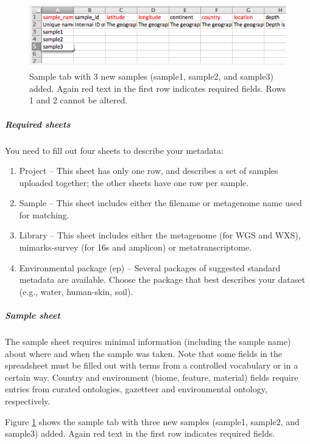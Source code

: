 \documentclass[12pt,fullpage]{report}
\begin{document}
\begin{figure}[ht]
\begin{center}
\includegraphics[width=6in]{Images/project-spreadsheet-with-3-samples.png}
\end{center}
\caption{
Sample tab with 3 new samples (sample1, sample2, and sample3) added. Again red text in the first row indicates required fields. Rows 1 and 2 cannot be altered.
}
\label{fig:project-spreadsheet-with-3-samples}
\end{figure}

\subparagraph*{Required sheets}
You need to fill out four sheets to describe your metadata:

\begin{enumerate}
\item Project --
This sheet has only one row, and describes a set of samples uploaded together; the other sheets have one row per sample.

\item Sample --
This sheet includes either the filename or metagenome name used for matching.

\item Library --
This sheet includes either the metagenome (for WGS and WXS), mimarks-survey (for \gls{16s} and amplicon) or metatranscriptome.

\item Environmental package (ep) --
Several packages of suggested standard metadata are available.
Choose the package that best describes your dataset (e.g., water, human-skin, soil).

\end{enumerate}

\subparagraph*{Sample sheet}
The sample sheet requires minimal information (including the sample name) about where and when the sample was taken. Note that some fields in the spreadsheet must be filled out with terms from a controlled vocabulary or in a certain way. Country and environment (biome, feature, material) fields require entries from curated ontologies, gazetteer and environmental ontology, respectively.

Figure \ref{fig:project-spreadsheet-with-3-samples}
shows the sample tab with three new samples (sample1, sample2, and sample3) added. Again red text in the first row indicates required fields.
\end{document}
